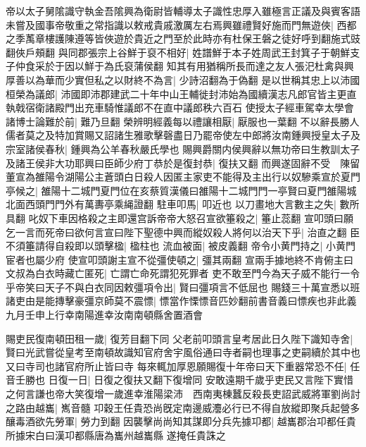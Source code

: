 帝以太子舅隂識守執金吾隂興為衛尉皆輔導太子識性忠厚入雖極言正議及與賓客語未嘗及國事帝敬重之常指識以敕戒貴戚激厲左右焉興雖禮賢好施而門無遊俠|{
	西都之季萭章樓護陳遵等皆俠遊於貴近之門至於此時亦有杜保王磐之徒好呼到翻施式豉翻俠戶頰翻}
與同郡張宗上谷鮮于裒不相好|{
	姓譜鮮于本子姓周武王封箕子于朝鮮支子仲食采於于因以鮮于為氏裒蒲侯翻}
知其有用猶稱所長而達之友人張汜杜禽與興厚善以為華而少實但私之以財終不為言|{
	少詩沼翻為于偽翻}
是以世稱其忠上以沛國桓榮為議郎|{
	沛國即沛郡建武二十年中山王輔徙封沛始為國續漢志凡郎官皆主更直執戟宿衛諸殿門出充車騎惟議郎不在直中議郎秩六百石}
使授太子經車駕幸太學會諸博士論難於前|{
	難乃旦翻}
榮辨明經義每以禮讓相厭|{
	厭服也一葉翻}
不以辭長勝人儒者莫之及特加賞賜又詔諸生雅歌擊磬盡日乃罷帝使左中郎將汝南鍾興授皇太子及宗室諸侯春秋|{
	鍾興為公羊春秋嚴氏學也}
賜興爵關内侯興辭以無功帝曰生教訓太子及諸王侯非大功耶興曰臣師少府丁恭於是復封恭|{
	復扶又翻}
而興遂固辭不受　陳留董宣為雒陽令湖陽公主蒼頭白日殺人因匿主家吏不能得及主出行以奴驂乘宣於夏門亭候之|{
	雒陽十二城門夏門位在亥蔡質漢儀曰雒陽十二城門門一亭賢曰夏門雒陽城北面西頭門門外有萬夀亭乘䋲證翻}
駐車叩馬|{
	叩近也}
以刀畫地大言數主之失|{
	數所具翻}
叱奴下車因格殺之主即還宫訴帝帝大怒召宣欲箠殺之|{
	箠止蕊翻}
宣叩頭曰願乞一言而死帝曰欲何言宣曰陛下聖德中興而縱奴殺人將何以治天下乎|{
	治直之翻}
臣不須箠請得自殺即以頭擊楹|{
	楹柱也}
流血被面|{
	被皮義翻}
帝令小黄門持之|{
	小黄門宦者也屬少府}
使宣叩頭謝主宣不從彊使頓之|{
	彊其兩翻}
宣兩手據地終不肯俯主曰文叔為白衣時藏亡匿死|{
	亡謂亡命死謂犯死罪者}
吏不敢至門今為天子威不能行一令乎帝笑曰天子不與白衣同因敕彊項令出|{
	賢曰彊項言不低屈也}
賜錢三十萬宣悉以班諸吏由是能摶擊豪彊京師莫不震慓|{
	慓當作慄慓音匹妙翻前書音義曰慓疾也非此義}
九月壬申上行幸南陽進幸汝南南頓縣舍置酒會

賜吏民復南頓田租一歲|{
	復芳目翻下同}
父老前叩頭言皇考居此日久陛下識知寺舍|{
	賢曰光武嘗從皇考至南頓故識知官府舍宇風俗通曰寺者嗣也理事之吏嗣續於其中也又曰寺司也諸官府所止皆曰寺}
每來輒加厚恩願賜復十年帝曰天下重器常恐不任|{
	任音壬勝也}
日復一日|{
	日復之復扶又翻下復增同}
安敢遠期千歲乎吏民又言陛下實惜之何言謙也帝大笑復增一歲進幸淮陽梁沛　西南夷棟蠶反殺長吏詔武威將軍劉尚討之路由越巂|{
	嶲音髓}
卭穀王任貴恐尚旣定南邊威灋必行已不得自放縱即聚兵起營多釀毒酒欲先勞軍|{
	勞力到翻}
因襲擊尚尚知其謀即分兵先據卭都|{
	越巂郡治卭都任貴所據宋白曰漢卭都縣唐為巂州越巂縣}
遂掩任貴誅之


